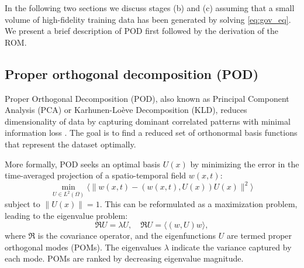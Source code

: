 \documentclass[11pt]{article}
\begin{document}
In the following two sections we discuss stages (b) and (c) assuming that a small volume of high-fidelity training data has been generated by solving \cref{eq:gov_eq}.
We present a brief description of POD first followed by the derivation of the ROM.























































\subsection{Proper orthogonal decomposition (POD)}
Proper Orthogonal Decomposition (POD), also known as Principal Component Analysis (PCA) or Karhunen-Lo\`eve Decomposition (KLD), reduces dimensionality of data by capturing dominant correlated patterns with minimal information loss \cite{chatterjee2000introductiona,holmes1996turbulence}. 
The goal is to find a reduced set of orthonormal basis functions that represent the dataset optimally.

More formally, POD seeks an optimal basis $U(x)$ by minimizing the error in the time-averaged projection of a spatio-temporal field $w(x,t)$:
\begin{equation}
 \underset{ U \in L^2(\Omega)}{\operatorname{min}} \Big \langle \| w(x,t) - ( w(x,t), U(x) ) U(x) \|^{2} \Big \rangle   
\end{equation}
subject to $\| U(x) \| = 1$. This can be reformulated as a maximization problem, leading to the eigenvalue problem:
\begin{equation}
\mathfrak{R} U = \lambda U, \quad \mathfrak{R} U = \langle (w, U)w \rangle,
\end{equation}
where $\mathfrak{R}$ is the covariance operator, and the eigenfunctions $U$ are termed proper orthogonal modes (POMs). The eigenvalues $\lambda$ indicate the variance captured by each mode. POMs are ranked by decreasing eigenvalue magnitude.
\end{document}
